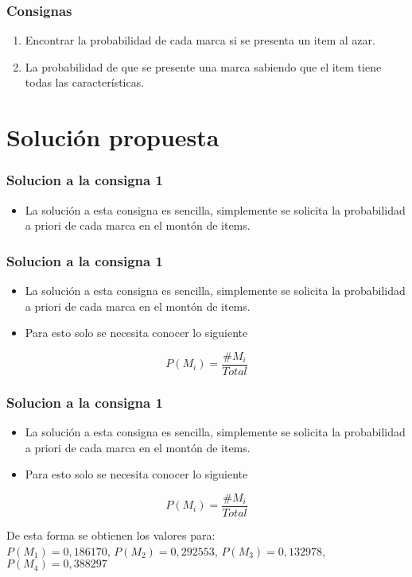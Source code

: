 \documentclass{beamer}
\begin{document}

\begin{frame}
\frametitle{Consignas}
\begin{enumerate}
\item Encontrar la probabilidad de cada marca si se presenta un item al azar.
\item La probabilidad de que se presente una marca sabiendo que el item tiene
todas las caracter\'isticas.
\end{enumerate}
\end{frame}

\section{Soluci\'on propuesta}
\begin{frame}
\frametitle{Solucion a la consigna 1}
\begin{itemize}
\item La soluci\'on a esta consigna es sencilla, simplemente se solicita la
probabilidad a priori de cada marca en el mont\'on de items.
\end{itemize}
\end{frame}

\begin{frame}
\frametitle{Solucion a la consigna 1}
\begin{itemize}
\item La soluci\'on a esta consigna es sencilla, simplemente se solicita la
probabilidad a priori de cada marca en el mont\'on de items.
\item Para esto solo se necesita conocer lo siguiente
\end{itemize}

\begin{equation*} \label{eq1}
	P(M_{i}) = \frac{\#M_{i}}{Total}
\end{equation*}
\end{frame}


\begin{frame}
\frametitle{Solucion a la consigna 1}
\begin{itemize}
\item La soluci\'on a esta consigna es sencilla, simplemente se solicita la
probabilidad a priori de cada marca en el mont\'on de items.
\item Para esto solo se necesita conocer lo siguiente
\end{itemize}

\begin{equation*} \label{eq1}
	P(M_{i}) = \frac{\#M_{i}}{Total}
\end{equation*}

De esta forma se obtienen los valores para:\\
$P(M_{1})=0,186170$, $P(M_{2})=0,292553$, $P(M_{3})=0,132978$,
$P(M_{4})=0,388297$
\end{frame}
\end{document}
